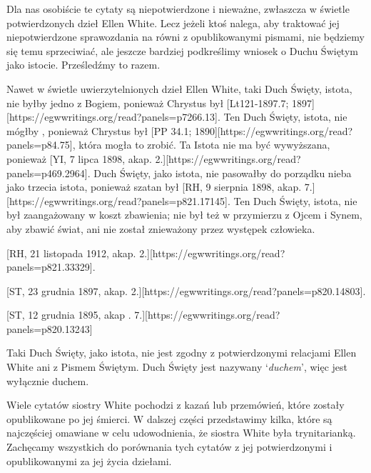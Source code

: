 Dla nas osobiście te cytaty są niepotwierdzone i nieważne, zwłaszcza w świetle potwierdzonych dzieł Ellen White. Lecz jeżeli ktoś nalega, aby traktować jej niepotwierdzone sprawozdania na równi z opublikowanymi pismami, nie będziemy się temu sprzeciwiać, ale jeszcze bardziej podkreślimy wniosek o Duchu Świętym jako istocie. Prześledźmy to razem.

Nawet w świetle uwierzytelnionych dzieł Ellen White, taki Duch Święty, istota, nie byłby jedno z Bogiem, ponieważ Chrystus był [Lt121-1897.7; 1897][https://egwwritings.org/read?panels=p7266.13]. Ten Duch Święty, istota, nie mógłby , ponieważ Chrystus był [PP 34.1; 1890][https://egwwritings.org/read?panels=p84.75], która mogła to zrobić. Ta Istota nie ma być wywyższana, ponieważ [YI, 7 lipca 1898, akap. 2.][https://egwwritings.org/read?panels=p469.2964]. Duch Święty, jako istota, nie pasowałby do porządku nieba jako trzecia istota, ponieważ szatan był [RH, 9 sierpnia 1898, akap. 7.][https://egwwritings.org/read?panels=p821.17145]. Ten Duch Święty, istota, nie był zaangażowany w koszt zbawienia; nie był też w przymierzu z Ojcem i Synem, aby zbawić świat, ani nie został znieważony przez występek człowieka.

[RH, 21 listopada 1912, akap. 2.][https://egwwritings.org/read?panels=p821.33329].

[ST, 23 grudnia 1897, akap. 2.][https://egwwritings.org/read?panels=p820.14803].

[ST, 12 grudnia 1895, akap . 7.][https://egwwritings.org/read?panels=p820.13243]

Taki Duch Święty, jako istota, nie jest zgodny z potwierdzonymi relacjami Ellen White ani z Pismem Świętym. Duch Święty jest nazywany ‘\textit{duchem}’, więc jest wyłącznie duchem.

Wiele cytatów siostry White pochodzi z kazań lub przemówień, które zostały opublikowane po jej śmierci. W dalszej części przedstawimy kilka, które są najczęściej omawiane w celu udowodnienia, że siostra White była trynitarianką. Zachęcamy wszystkich do porównania tych cytatów z jej potwierdzonymi i opublikowanymi za jej życia dziełami.

